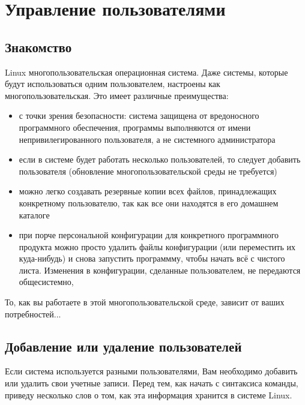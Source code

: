 \documentclass[10pt]{book}
\begin{document}
\newpage

\pagestyle{headings}
\chapter{Управление пользователями}

\section{Знакомство}

Linux {\texttwelveudash} многопользовательская операционная система. Даже системы, которые будут использоваться одним пользователем, настроены как многопользовательская. Это имеет различные преимущества:

\begin{itemize} 
\item с точки зрения безопасности: система защищена от вредоносного программного обеспечения, программы выполняются от имени непривилегированного пользователя, а не системного администратора

\item если в системе будет работать несколько пользователей, то следует добавить пользователя (обновление многопользовательской среды не требуется)

\item можно легко создавать резервные копии всех файлов, принадлежащих конкретному пользователю, так как все они находятся в его домашнем каталоге

\item при порче персональной конфигурации для конкретного программного продукта можно просто удалить файлы конфигурации (или переместить их куда-нибудь) и снова запустить программму, чтобы начать всё с чистого листа. Изменения в конфигурации,  сделанные пользователем, не передаются общесистемно, 
\end{itemize}

То, как вы работаете в этой многопользовательской среде, зависит от ваших потребностей...

\section{Добавление или удаление пользователей}

Если система используется разными пользователями, Вам необходимо добавить или удалить свои учетные записи. Перед тем, как начать с синтаксиса команды, приведу несколько слов о том, как эта информация хранится в системе Linux.
\end{document}
